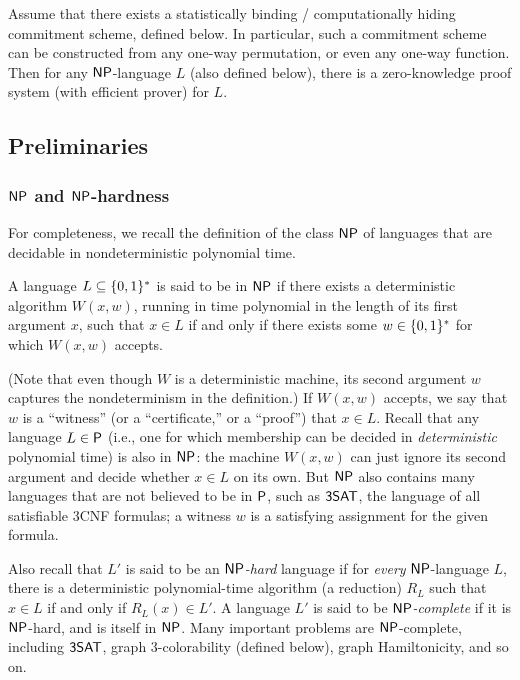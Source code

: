 \documentclass[11pt]{article}
\begin{document}
\begin{theorem}
  \label{thm:zkp-np}
  Assume that there exists a statistically binding / computationally
  hiding commitment scheme, defined below.  In particular, such a
  commitment scheme can be constructed from any one-way permutation,
  or even any one-way function.  Then for any $\NP$-language $L$ (also
  defined below), there is a zero-knowledge proof system (with
  efficient prover) for $L$.  
\end{theorem}

\subsection{Preliminaries}
\label{sec:preliminaries}

\subsubsection{$\NP$ and $\NP$-hardness}
\label{sec:np}

For completeness, we recall the definition of the class $\NP$ of
languages that are decidable in nondeterministic polynomial time.

\begin{definition}
  \label{def:np}
  A language $L \subseteq \bit^{*}$ is said to be in $\NP$ if there
  exists a deterministic algorithm $W(x,w)$, running in time
  polynomial in the length of its first argument $x$, such that $x \in
  L$ if and only if there exists some $w \in \bit^{*}$ for which
  $W(x,w)$ accepts.
\end{definition}

(Note that even though $W$ is a deterministic machine, its second
argument $w$ captures the nondeterminism in the definition.)  If
$W(x,w)$ accepts, we say that $w$ is a ``witness'' (or a
``certificate,'' or a ``proof'') that $x \in L$.  Recall that any
language $L \in \P$ (i.e., one for which membership can be decided in
\emph{deterministic} polynomial time) is also in $\NP$: the machine
$W(x,w)$ can just ignore its second argument and decide whether $x \in
L$ on its own.  But $\NP$ also contains many languages that are not
believed to be in $\P$, such as $\problem{3SAT}$, the language of all
satisfiable 3CNF formulas; a witness $w$ is a satisfying assignment
for the given formula.

Also recall that $L'$ is said to be an \emph{$\NP$-hard} language if
for \emph{every} $\NP$-language $L$, there is a deterministic
polynomial-time algorithm (a reduction) $R_{L}$ such that $x \in L$ if
and only if $R_{L}(x) \in L'$.  A language $L'$ is said to be
\emph{$\NP$-complete} if it is $\NP$-hard, and is itself in $\NP$.
Many important problems are $\NP$-complete, including
$\problem{3SAT}$, graph $3$-colorability (defined below), graph
Hamiltonicity, and so on.
\end{document}
